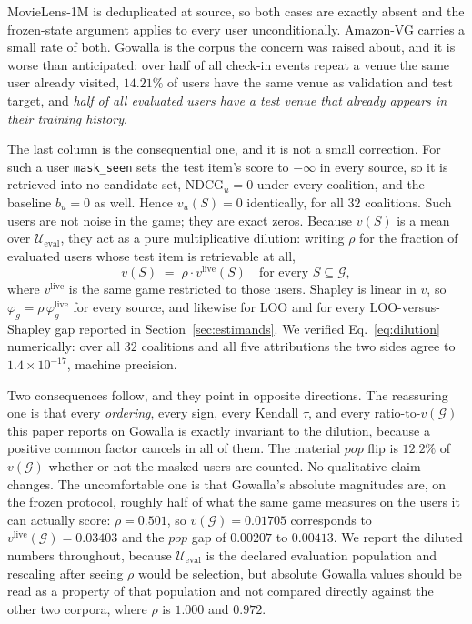 \documentclass[pdflatex,sn-basic,Numbered]{sn-jnl}
\theoremstyle{plain}
\theoremstyle{definition}
\newcommand{\G}{\mathcal{G}}
\newcommand{\Ueval}{\mathcal{U}_{\mathrm{eval}}}
\begin{document}
MovieLens-1M is deduplicated at source, so both cases are exactly absent and
the frozen-state argument applies to every user unconditionally. Amazon-VG
carries a small rate of both. Gowalla is the corpus the concern was raised
about, and it is worse than anticipated: over half of all check-in events
repeat a venue the same user already visited, $14.21\%$ of users have the same
venue as validation and test target, and \emph{half of all evaluated users have
a test venue that already appears in their training history}.

The last column is the consequential one, and it is not a small correction.
For such a user \texttt{mask\_seen} sets the test item's score to $-\infty$ in
every source, so it is retrieved into no candidate set, $\mathrm{NDCG}_u = 0$
under every coalition, and the baseline $b_u = 0$ as well. Hence
$v_u(S) = 0$ identically, for all $32$ coalitions. Such users are not noise
in the game; they are exact zeros. Because $v(S)$ is a mean over $\Ueval$,
they act as a pure multiplicative dilution: writing $\rho$ for the fraction of
evaluated users whose test item is retrievable at all,
\begin{equation}
v(S) \;=\; \rho \cdot v^{\mathrm{live}}(S) \quad \text{for every } S \subseteq \G ,
\label{eq:dilution}
\end{equation}
where $v^{\mathrm{live}}$ is the same game restricted to those users. Shapley
is linear in $v$, so $\varphi_g = \rho\,\varphi_g^{\mathrm{live}}$ for every
source, and likewise for LOO and for every LOO-versus-Shapley gap reported in
Section~\ref{sec:estimands}.
We verified Eq.~\eqref{eq:dilution} numerically: over all $32$ coalitions and
all five attributions the two sides agree to $1.4\times 10^{-17}$, machine
precision.

Two consequences follow, and they point in opposite directions. The reassuring
one is that every \emph{ordering}, every sign, every Kendall $\tau$, and every
ratio-to-$v(\G)$ this paper reports on Gowalla is exactly invariant to the
dilution, because a positive common factor cancels in all of them. The
material $pop$ flip is $12.2\%$ of $v(\G)$ whether or not the masked users are
counted. No qualitative claim changes. The uncomfortable one is that Gowalla's
absolute magnitudes are, on the frozen protocol, roughly half of what the same
game measures on the users it can actually score: $\rho = 0.501$, so
$v(\G) = 0.01705$ corresponds to $v^{\mathrm{live}}(\G) = 0.03403$ and the
$pop$ gap of $0.00207$ to $0.00413$. We report the diluted numbers throughout,
because $\Ueval$ is the declared evaluation population and rescaling after
seeing $\rho$ would be selection, but absolute Gowalla values should be read
as a property of that population and not compared directly against the other
two corpora, where $\rho$ is $1.000$ and $0.972$.
\end{document}
